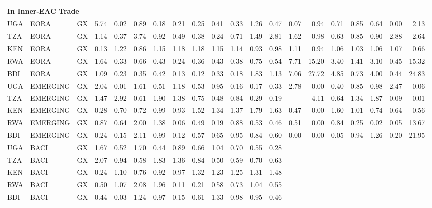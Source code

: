 \documentclass[a4paper]{article}
\begin{document}
\begin{table}[ht]
{\begin{tabular}{lllrrrrrrrrrrrrrrrrr}
   \multicolumn{10}{l}{In Inner-EAC Trade} \\ \midrule
  UGA & EORA & GX & 5.74 & 0.02 & 0.89 & 0.18 & 0.21 & 0.25 & 0.41 & 0.33 & 1.26 & 0.47 & 0.07 & 0.94 & 0.71 & 0.85 & 0.64 & 0.00 & 2.13 \\ 
  TZA & EORA & GX & 1.14 & 0.37 & 3.74 & 0.92 & 0.49 & 0.38 & 0.24 & 0.71 & 1.49 & 2.81 & 1.62 & 0.98 & 0.63 & 0.85 & 0.90 & 2.88 & 2.64 \\ 
  KEN & EORA & GX & 0.13 & 1.22 & 0.86 & 1.15 & 1.18 & 1.18 & 1.15 & 1.14 & 0.93 & 0.98 & 1.11 & 0.94 & 1.06 & 1.03 & 1.06 & 1.07 & 0.66 \\ 
  RWA & EORA & GX & 1.64 & 0.33 & 0.66 & 0.43 & 0.24 & 0.36 & 0.43 & 0.38 & 0.75 & 0.54 & 7.71 & 15.20 & 3.40 & 1.41 & 3.10 & 0.45 & 15.32 \\ 
  BDI & EORA & GX & 1.09 & 0.23 & 0.35 & 0.42 & 0.13 & 0.12 & 0.33 & 0.18 & 1.83 & 1.13 & 7.06 & 27.72 & 4.85 & 0.73 & 4.00 & 0.44 & 24.83 \\ \midrule
  UGA & EMERGING & GX & 2.04 & 0.01 & 1.61 & 0.51 & 1.18 & 0.53 & 0.95 & 0.16 & 0.17 & 0.33 & 2.78 & 0.00 & 0.40 & 0.85 & 0.98 & 2.47 & 0.06 \\ 
  TZA & EMERGING & GX & 1.47 & 2.92 & 0.61 & 1.90 & 1.38 & 0.75 & 0.48 & 0.84 & 0.29 & 0.19 &  & 4.11 & 0.64 & 1.34 & 1.87 & 0.09 & 0.01 \\ 
  KEN & EMERGING & GX & 0.28 & 0.70 & 0.72 & 0.99 & 0.93 & 1.52 & 1.34 & 1.37 & 1.79 & 1.63 & 0.47 & 0.00 & 1.60 & 1.01 & 0.74 & 0.64 & 0.56 \\ 
  RWA & EMERGING & GX & 0.87 & 0.64 & 2.00 & 1.38 & 0.06 & 0.49 & 0.19 & 0.88 & 0.53 & 0.46 & 0.51 & 0.00 & 0.84 & 0.25 & 0.02 & 0.05 & 13.67 \\ 
  BDI & EMERGING & GX & 0.24 & 0.15 & 2.11 & 0.99 & 0.12 & 0.57 & 0.65 & 0.95 & 0.84 & 0.60 & 0.00 & 0.00 & 0.05 & 0.94 & 1.26 & 0.20 & 21.95 \\  \midrule
  UGA & BACI & GX & 1.67 & 0.52 & 1.70 & 0.44 & 0.89 & 0.66 & 1.04 & 0.70 & 0.55 & 0.28 &  &  &  &  &  &  &  \\ 
  TZA & BACI & GX & 2.07 & 0.94 & 0.58 & 1.83 & 1.36 & 0.84 & 0.50 & 0.59 & 0.70 & 0.63 &  &  &  &  &  &  &  \\ 
  KEN & BACI & GX & 0.24 & 1.10 & 0.76 & 0.92 & 0.97 & 1.32 & 1.23 & 1.25 & 1.31 & 1.48 &  &  &  &  &  &  &  \\ 
  RWA & BACI & GX & 0.50 & 1.07 & 2.08 & 1.96 & 0.11 & 0.21 & 0.58 & 0.73 & 1.04 & 0.55 &  &  &  &  &  &  &  \\ 
  BDI & BACI & GX & 0.44 & 0.03 & 1.24 & 0.97 & 0.15 & 0.61 & 1.33 & 0.98 & 0.95 & 0.46 &  &  &  &  &  &  &  \\ \midrule

\end{tabular}}
\end{table}
\end{document}
